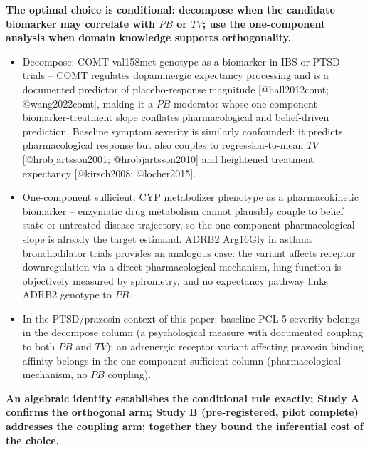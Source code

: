 \documentclass[
  11pt,
]{article}
\begin{document}
\textbf{The optimal choice is conditional: decompose when the candidate biomarker may correlate with $PB$ or $TV$; use the one-component analysis when domain knowledge supports orthogonality.}

\begin{itemize}\setlength{\itemsep}{2pt}\setlength{\parskip}{0pt}
\item Decompose: COMT val158met genotype as a biomarker in IBS or PTSD trials -- COMT regulates dopaminergic expectancy processing and is a documented predictor of placebo-response magnitude [@hall2012comt; @wang2022comt], making it a $PB$ moderator whose one-component biomarker-treatment slope conflates pharmacological and belief-driven prediction. Baseline symptom severity is similarly confounded: it predicts pharmacological response but also couples to regression-to-mean $TV$ [@hrobjartsson2001; @hrobjartsson2010] and heightened treatment expectancy [@kirsch2008; @locher2015].
\item One-component sufficient: CYP metabolizer phenotype as a pharmacokinetic biomarker -- enzymatic drug metabolism cannot plausibly couple to belief state or untreated disease trajectory, so the one-component pharmacological slope is already the target estimand. ADRB2 Arg16Gly in asthma bronchodilator trials provides an analogous case: the variant affects receptor downregulation via a direct pharmacological mechanism, lung function is objectively measured by spirometry, and no expectancy pathway links ADRB2 genotype to $PB$.
\item In the PTSD/prazosin context of this paper: baseline PCL-5 severity belongs in the decompose column (a psychological measure with documented coupling to both $PB$ and $TV$); an adrenergic receptor variant affecting prazosin binding affinity belongs in the one-component-sufficient column (pharmacological mechanism, no $PB$ coupling).
\end{itemize}

\textbf{An algebraic identity establishes the conditional rule exactly; Study A confirms the orthogonal arm; Study B (pre-registered, pilot complete) addresses the coupling arm; together they bound the inferential cost of the choice.}
\end{document}
